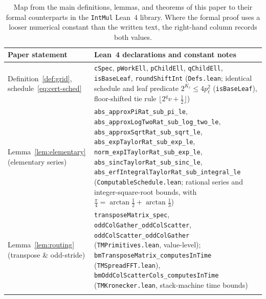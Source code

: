 \begin{table}[!t]
\centering
\footnotesize
\caption{Map from the main definitions, lemmas, and theorems of this paper to their formal counterparts in the \texttt{IntMul} Lean~4 library. Where the formal proof uses a looser numerical constant than the written text, the right-hand column records both values.}
\label{tab:lean-map}
\setlength{\tabcolsep}{4.5pt}
\begin{tabular}{@{}>{\raggedright}p{}>{\raggedright\arraybackslash}p{}@{}}
\toprule
Paper statement & Lean~4 declarations and constant notes \\
\midrule
Definition~\ref{def:grid}, schedule~\eqref{eq:cert-sched} & \texttt{cSpec}, \texttt{pWorkEll}, \texttt{pChildEll}, \texttt{qChildEll}, \texttt{isBaseLeaf}, \texttt{roundShiftInt} (\texttt{Defs.lean}; identical schedule and leaf predicate $2^{K_\ell} \le 4 p_\ell^2$ (\texttt{isBaseLeaf}), floor-shifted tie rule $\lfloor 2^q v + \tfrac{1}{2}\rfloor$) \\\addlinespace[1.5pt]
Lemma~\ref{lem:elementary} (elementary series) & \texttt{abs\_\allowbreak approxPiRat\_\allowbreak sub\_\allowbreak pi\_\allowbreak le}, \texttt{abs\_\allowbreak approxLogTwoRat\_\allowbreak sub\_\allowbreak log\_\allowbreak two\_\allowbreak le}, \texttt{abs\_\allowbreak approxSqrtRat\_\allowbreak sub\_\allowbreak sqrt\_\allowbreak le}, \texttt{abs\_\allowbreak expTaylorRat\_\allowbreak sub\_\allowbreak exp\_\allowbreak le}, \texttt{norm\_\allowbreak expITaylorRat\_\allowbreak sub\_\allowbreak exp\_\allowbreak le}, \texttt{abs\_\allowbreak sincTaylorRat\_\allowbreak sub\_\allowbreak sinc\_\allowbreak le}, \texttt{abs\_\allowbreak erfIntegral\allowbreak TaylorRat\_\allowbreak sub\_\allowbreak integral\_\allowbreak le} (\texttt{Computable\allowbreak Schedule.lean}; rational series and integer-square-root bounds, with $\frac{\pi}{4}=\arctan\frac{1}{2}+\arctan\frac{1}{3}$) \\\addlinespace[1.5pt]
Lemma~\ref{lem:routing} (transpose \& odd-stride) & \texttt{transposeMatrix\_\allowbreak spec}, \texttt{oddColGather\_\allowbreak oddColScatter}, \texttt{oddColScatter\_\allowbreak oddColGather} (\texttt{TMPrimitives.lean}, value-level); \texttt{bmTranspose\allowbreak Matrix\_\allowbreak computesInTime} (\texttt{TMSpread\allowbreak FFT.lean}), \texttt{bmOddCol\allowbreak ScatterCols\_\allowbreak computesInTime} (\texttt{TMKronecker.lean}, stack-machine time bounds) \\\addlinespace[1.5pt]

\end{tabular}
\end{table}
